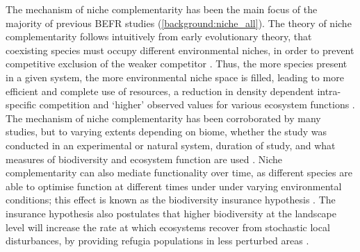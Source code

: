 \begin{refsection}
The mechanism of niche complementarity has been the main focus of the majority of previous BEFR studies \citep{Wright2017} (\autoref{background:niche_all}). The theory of niche complementarity follows intuitively from early evolutionary theory, that coexisting species must occupy different environmental niches, in order to prevent competitive exclusion of the weaker competitor \citep{Tobner2016, Levine2009, MacArthur1955}. Thus, the more species present in a given system, the more environmental niche space is filled, leading to more efficient and complete use of resources, a reduction in density dependent intra-specific competition and `higher' observed values for various ecosystem functions \citep{Isbell2013}. The mechanism of niche complementarity has been corroborated by many studies, but to varying extents depending on biome, whether the study was conducted in an experimental or natural system, duration of study, and what measures of biodiversity and ecosystem function are used \citep{Wright2017, Cardinale2009, Cardinale2011}. Niche complementarity can also mediate functionality over time, as different species are able to optimise function at different times under under varying environmental conditions; this effect is known as the biodiversity insurance hypothesis \citep{Morin2014b, Bartomeus2013, Yachi1999a}. The insurance hypothesis also postulates that higher biodiversity at the landscape level will increase the rate at which ecosystems recover from stochastic local disturbances, by providing refugia populations in less perturbed areas \citep{Gonzalez2009}. 


\end{refsection}

